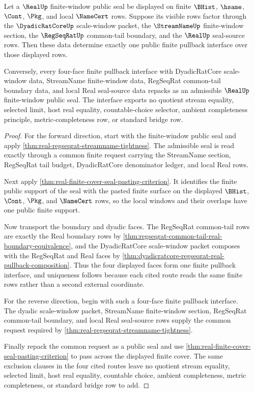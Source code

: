 \begin{theorem}
\label{thm:real-l10-four-face-finite-pullback-public-interface}
Let a $\RealUp$ finite-window public seal be displayed on finite $\BHist$, $\hsame$, $\Cont$, $\Pkg$, and local $\NameCert$ rows. Suppose its visible rows factor through the $\DyadicRatCoreUp$ scale-window packet, the $\StreamNameUp$ finite-window section, the $\RegSeqRatUp$ common-tail boundary, and the $\RealUp$ seal-source rows. Then these data determine exactly one public finite pullback interface over those displayed rows.

Conversely, every four-face finite pullback interface with DyadicRatCore scale-window data, StreamName finite-window data, RegSeqRat common-tail boundary data, and local Real seal-source data repacks as an admissible $\RealUp$ finite-window public seal. The interface exports no quotient stream equality, selected limit, host real equality, countable-choice selector, ambient completeness principle, metric-completeness row, or standard bridge row.
\end{theorem}
\begin{proof}
For the forward direction, start with the finite-window public seal and apply \autoref{thm:real-regseqrat-streamname-tightness}. The admissible seal is read exactly through a common finite request carrying the StreamName section, RegSeqRat tail budget, DyadicRatCore denominator ledger, and local Real rows.

Next apply \autoref{thm:real-finite-cover-seal-pasting-criterion}. It identifies the finite public support of the seal with the pasted finite surface on the displayed $\BHist$, $\Cont$, $\Pkg$, and $\NameCert$ rows, so the local windows and their overlaps have one public finite support.

Now transport the boundary and dyadic faces. The RegSeqRat common-tail rows are exactly the Real boundary rows by \autoref{thm:regseqrat-common-tail-real-boundary-equivalence}, and the DyadicRatCore scale-window packet composes with the RegSeqRat and Real faces by \autoref{thm:dyadicratcore-regseqrat-real-pullback-composition}. Thus the four displayed faces form one finite pullback interface, and uniqueness follows because each cited route reads the same finite rows rather than a second external coordinate.

For the reverse direction, begin with such a four-face finite pullback interface. The dyadic scale-window packet, StreamName finite-window section, RegSeqRat common-tail boundary, and local Real seal-source rows supply the common request required by \autoref{thm:real-regseqrat-streamname-tightness}.

Finally repack the common request as a public seal and use \autoref{thm:real-finite-cover-seal-pasting-criterion} to pass across the displayed finite cover. The same exclusion clauses in the four cited routes leave no quotient stream equality, selected limit, host real equality, countable choice, ambient completeness, metric completeness, or standard bridge row to add.
\end{proof}


